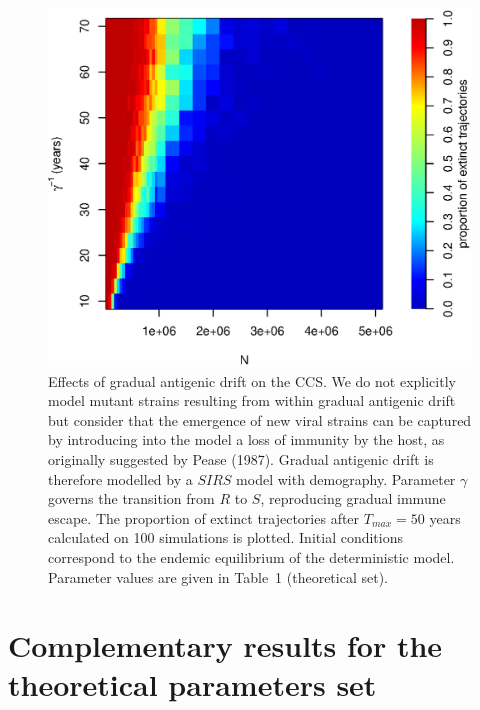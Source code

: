 \begin{figure}[!h]
  \center
  \includegraphics[width=0.5\linewidth]{graphs/article1/ccs_sirs.eps}
  \caption{Effects of gradual antigenic drift on the CCS. We do not
    explicitly model mutant strains resulting from within gradual
    antigenic drift but consider that the emergence of new viral
    strains can be captured by introducing into the model a loss of
    immunity by the host, as originally suggested by Pease (1987).
    Gradual antigenic drift is therefore modelled by a $SIRS$ model
    with demography. Parameter $\gamma$ governs the transition from
    $R$ to $S$, reproducing gradual immune escape. The proportion of
    extinct trajectories after $T_{max} = 50$ years calculated on 100
    simulations is plotted. Initial conditions correspond to the
    endemic equilibrium of the deterministic model. Parameter values
    are given in Table~1 (theoretical set).}
\label{fig:ccs_sirs}
\end{figure}

\clearpage

\section{Complementary results for the theoretical parameters set}

